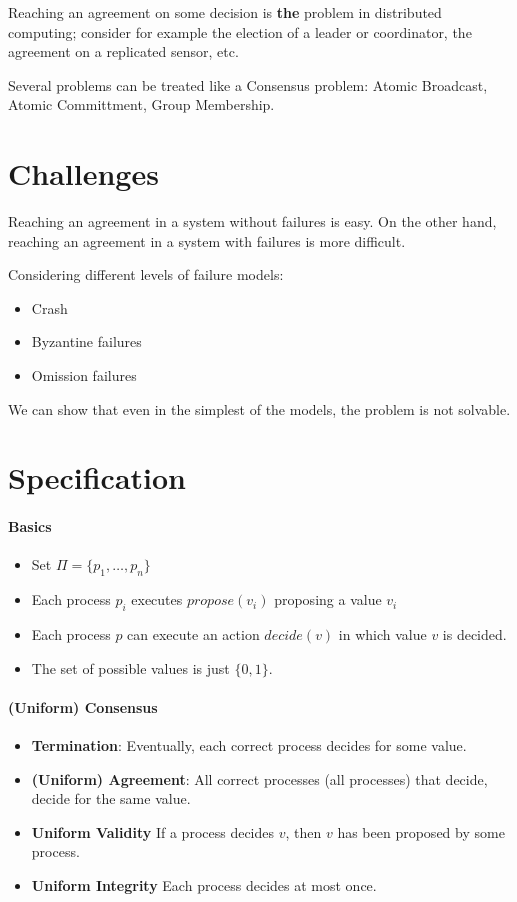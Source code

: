 \documentclass[12pt]{article}
\newcommand{\BI}{\begin{itemize}}
\newcommand{\EI}{\end{itemize}}
\newcommand{\propose}{\mathit{propose}}
\newcommand{\decide}{\mathit{decide}}
\begin{document}
Reaching an agreement on some decision is {\bf the} problem in distributed
computing; consider for example the election of a leader or coordinator, the
agreement on a replicated sensor, etc.

Several problems can be treated like a Consensus problem: Atomic Broadcast, 
Atomic Committment, Group Membership.

\section*{Challenges}

Reaching an agreement in a system without failures is easy. 
On the other hand, reaching an agreement in a system with failures is
more difficult.

Considering different levels of failure models:
\BI
\item Crash
\item Byzantine failures
\item Omission failures
\EI
We can show that even in the simplest of the models, the problem is
not solvable.

\section*{Specification}

\paragraph{Basics}
\BI
\item Set $\Pi = \{ p_1, \ldots, p_n \}$
\item Each process $p_i$ executes $\propose(v_i)$ proposing a value $v_i$
\item Each process $p$ can execute an action $\decide(v)$ in which value
  $v$ is decided.
\item The set of possible values is just $\{ 0, 1\}$.
\EI

\paragraph{(Uniform) Consensus}
\BI
\item {\bf Termination}: Eventually, each correct process decides for some
  value.
\item {\bf (Uniform) Agreement}: All correct processes (all processes) that 
  decide, decide for the same value.
\item {\bf Uniform Validity}
  If a process decides $v$, then $v$ has been proposed by some process.
\item {\bf Uniform Integrity}
  Each process decides at most once.
\EI
\end{document}
